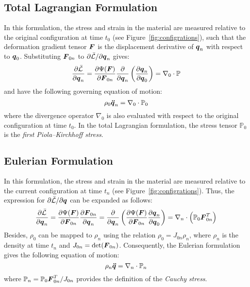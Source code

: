 \subsection{Total Lagrangian Formulation}

In this formulation, the stress and strain in the material are measured relative to the original configuration at time $t_0$ (see Figure~\ref{fig:configrations}), such that the deformation gradient tensor $\boldsymbol{F}$ is the displacement derivative of $\boldsymbol{q}_n$ with respect to $\boldsymbol{q}_0$. Substituting $\boldsymbol{F}_{0n}$ to $\partial \bar{\mathcal{L}}/\partial \boldsymbol{q}_n$ gives:
 $$\frac{\partial \bar{\mathcal{L}}}{\partial \boldsymbol{q}_n}=\frac{\partial\Psi(\boldsymbol{F})}{\partial\boldsymbol{F}_{0n}}\frac{\partial}{\partial \boldsymbol{q}_n}\left(\frac{\partial \boldsymbol{q}_n}{\partial \boldsymbol{q}_0}\right)=\nabla_0\cdot\mathbb{P}$$
 and have the following governing equation of motion:
    \begin{equation}
      \rho_0 \boldsymbol{\ddot{q}}_n=\nabla_{0}\cdot\mathbb{P}_0 
      \label{eq:Lagrangian GE}
    \end{equation}
where the divergence operator $\nabla_0$ is also evaluated with respect to the original configuration at time $t_0$. In the total Lagrangian formulation, the stress tensor $\mathbb{P}_0$ is the \emph{first Piola–Kirchhoff stress}. 

\subsection{Eulerian Formulation}

In this formulation, the stress and strain in the material are measured relative to the current configuration at time $t_n$ (see Figure~\ref{fig:configrations}). Thus, the expression for ${\partial \bar{\mathcal{L}}}/{\partial \boldsymbol{q}}$ can be expanded as follows:
$$\frac{\partial \bar{\mathcal{L}}}{\partial \boldsymbol{q}_n}=
\frac{\partial\Psi(\boldsymbol{F})}{\partial\boldsymbol{F}_{0n}}\frac{\partial \boldsymbol{F}_{0n}}{\partial \boldsymbol{q}_n}=
\frac{\partial}{\partial \boldsymbol{q}_n}\left(\frac{\partial\Psi(\boldsymbol{F})}{\partial\boldsymbol{F}_{0n}}\frac{\partial \boldsymbol{q}_n}{\partial \boldsymbol{q}_0}\right)=\nabla_n\cdot\left(\mathbb{P}_0\boldsymbol{F}_{0n}^T\right)$$
Besides, $\rho_0$ can be mapped to $\rho_n$ using the relation $\rho_0=J_{0n}\rho_n$, where $\rho_n$ is the density at time $t_n$ and $J_{0n}=\text{det}(\boldsymbol{F}_{0n})$. Consequently, the Eulerian formulation gives the following equation of motion:
\begin{equation}
    \rho_n\bs{\ddot{q}}=\nabla_n\cdot \mathbb{P}_n%
    \label{eq:Euleraian GE}
\end{equation}
where $\mathbb{P}_n=\mathbb{P}_0\boldsymbol{F}_{0n}^T/{J_{0n}}$ provides the definition of the \emph{Cauchy stress}.

